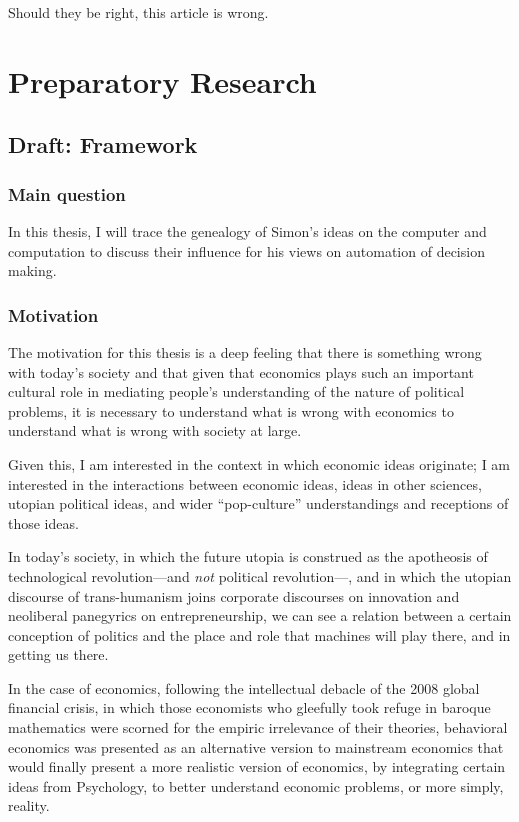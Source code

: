 \documentclass[draft=false, paper=A4,portrait,twoside=true,twocolumn=false,headinclude=false,footinclude=false,fontsize=11,BCOR=15mm,DIV=calc,pagesize=auto,titlepage=firstiscover,mpinclude=true,headings=big,headings=twolinechapter,open=right,chapterprefix=false,headsepline=false,parskip=full]{scrbook}
\begin{document}
Should they be right, this article is wrong. 

\mainmatter
\pagestyle{scrheadings}
\part{Preparatory Research}
\label{sec:org189a66c}
\chapter{Draft: Framework}
\label{sec:orge777747}
\section{Main question}
\label{sec:orge61f8be}
In this thesis, I will trace the genealogy of Simon's ideas on the computer
and computation to discuss their influence for his views on automation
of decision making. 
\section{Motivation}
\label{sec:orge5bd378}
The motivation for this thesis is a deep feeling that there is something
wrong with today's society and that given that economics plays such an
important cultural role in mediating people's understanding of the nature
of political problems, it is necessary to understand what is wrong with
economics to understand what is wrong with society at large. 

Given this, I am interested in the context in which economic ideas
originate; I am interested in the interactions between economic ideas,
ideas in other sciences, utopian political ideas, and wider ``pop-culture''
understandings and receptions of those ideas.

In today's society, in which the future utopia is construed as the
apotheosis of technological revolution---and \emph{not} political revolution---,
and in which the utopian discourse of trans-humanism joins corporate
discourses on innovation and neoliberal panegyrics on entrepreneurship, we
can see a relation between a certain conception of politics and the place
and role that machines will play there, and in getting us there.

In the case of economics, following the intellectual debacle of the 2008
global financial crisis, in which those economists who gleefully took 
refuge in baroque mathematics were scorned for the empiric irrelevance of
their theories, behavioral economics was presented as an alternative
version to mainstream economics that would finally present a more realistic
version of economics, by integrating certain ideas from Psychology, to
better understand economic problems, or more simply, reality.  
\end{document}
